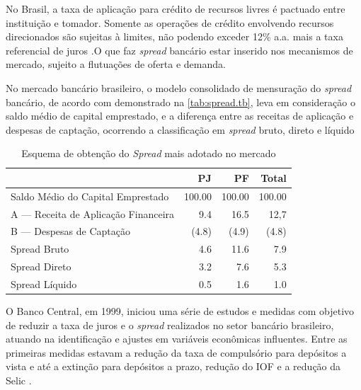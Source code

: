 \documentclass[
  12pt,
  12pt,
  openright,
  oneside,
  a4paper,
  chapter=TITLE,
  section=TITLE,
  subsection=TITLE,
  subsubsection=TITLE,
  english,
  portugues,
  sumario=tradicional]{abntex2}
\begin{document}
No Brasil, a taxa de aplicação para crédito de recursos livres é pactuado entre instituição e tomador. Somente as operações de crédito envolvendo recursos direcionados são sujeitas à limites, não podendo exceder 12\% a.a. mais a taxa referencial de juros \cite{BCB:2016}.O que faz \emph{spread} bancário estar inserido nos mecanismos de mercado, sujeito a flutuações de oferta e demanda.

No mercado bancário brasileiro, o modelo consolidado de mensuração do \emph{spread} bancário, de acordo com demonstrado na \autoref{tab:spread.tb}, leva em consideração o saldo médio de capital emprestado, e a diferença entre as receitas de aplicação e despesas de captação, ocorrendo a classificação em \emph{spread} bruto, direto e líquido \cite{fipecafi:2005}

\begin{table}[!htbp]
\vspace{20pt}
 \centering
   \caption{Esquema de obtenção do \emph{Spread} mais adotado no mercado} 
   \vspace{1mm}
    \label{tab:spread.tb}
     \begin{tabular}{l|r|r|r}
      \hline
                                           &   PJ   &   PF    & Total \\
       \hline
       Saldo Médio do Capital Emprestado   & 100.00 & 100.00  & 100.00 \\
       A — Receita de Aplicação Financeira & 9.4    & 16.5    & 12,7   \\
       B — Despesas de Captação            & (4.8)  & (4.9)   & (4.8)  \\   
       Spread Bruto                        & 4.6    & 11.6    & 7.9    \\
       Spread Direto                       & 3.2    & 7.6     & 5.3    \\
       Spread Líquido                      & 0.5    & 1.6     & 1.0    \\
       \hline
       \end{tabular}
\vspace{1mm}
\vspace{-2mm}
\end{table}

O Banco Central, em 1999, iniciou uma série de estudos e medidas com objetivo de reduzir a taxa de juros e o \emph{spread} realizados no setor bancário brasileiro, atuando na identificação e ajustes em variáveis econômicas influentes. Entre as primeiras medidas estavam a redução da taxa de compulsório para depósitos a vista e até a extinção para depósitos a prazo, redução do IOF e a redução da Selic \cite{BCB:2000}.
\end{document}
